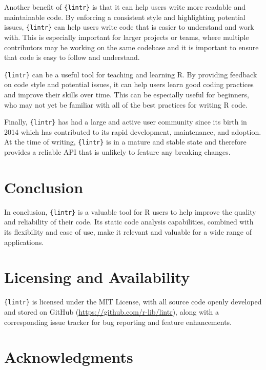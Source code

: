 \documentclass[10pt,a4paper,onecolumn]{article}
\begin{document}
Another benefit of \texttt{\{lintr\}} is that it can help users write
more readable and maintainable code. By enforcing a consistent style and
highlighting potential issues, \texttt{\{lintr\}} can help users write
code that is easier to understand and work with. This is especially
important for larger projects or teams, where multiple contributors may
be working on the same codebase and it is important to ensure that code
is easy to follow and understand.

\texttt{\{lintr\}} can be a useful tool for teaching and learning R. By
providing feedback on code style and potential issues, it can help users
learn good coding practices and improve their skills over time. This can
be especially useful for beginners, who may not yet be familiar with all
of the best practices for writing R code.

Finally, \texttt{\{lintr\}} has had a large and active user community
since its birth in 2014 which has contributed to its rapid development,
maintenance, and adoption. At the time of writing, \texttt{\{lintr\}} is
in a mature and stable state and therefore provides a reliable API that
is unlikely to feature any breaking changes.

\hypertarget{conclusion}{%
\section{Conclusion}\label{conclusion}}

In conclusion, \texttt{\{lintr\}} is a valuable tool for R users to help
improve the quality and reliability of their code. Its static code
analysis capabilities, combined with its flexibility and ease of use,
make it relevant and valuable for a wide range of applications.

\hypertarget{licensing-and-availability}{%
\section{Licensing and Availability}\label{licensing-and-availability}}

\texttt{\{lintr\}} is licensed under the MIT License, with all source
code openly developed and stored on GitHub
(\url{https://github.com/r-lib/lintr}), along with a corresponding issue
tracker for bug reporting and feature enhancements.

\hypertarget{acknowledgments}{%
\section{Acknowledgments}\label{acknowledgments}}
\end{document}
